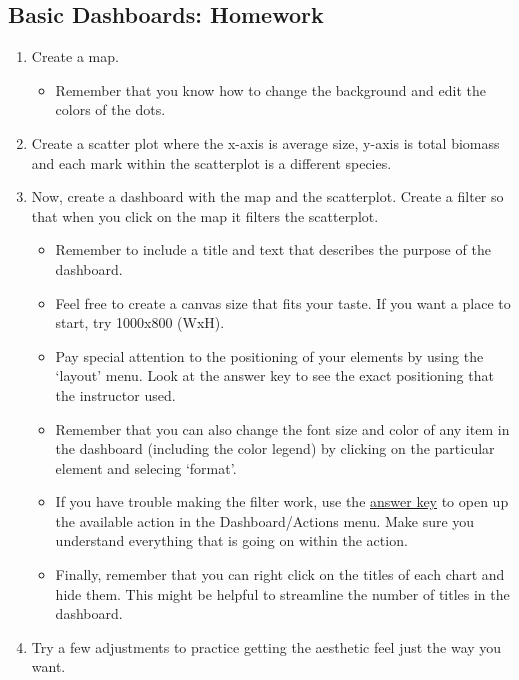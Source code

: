 \documentclass[
]{book}
\providecommand{\tightlist}{%
  \setlength{\itemsep}{0pt}\setlength{\parskip}{0pt}}
\begin{document}
\hypertarget{basic-dashboards-homework}{%
\subsection{Basic Dashboards: Homework}\label{basic-dashboards-homework}}

\begin{enumerate}
\def\labelenumi{\arabic{enumi}.}
\tightlist
\item
  Create a map.

  \begin{itemize}
  \tightlist
  \item
    Remember that you know how to change the background and edit the colors of the dots.
  \end{itemize}
\item
  Create a scatter plot where the x-axis is average size, y-axis is total biomass and each mark within the scatterplot is a different species.
\item
  Now, create a dashboard with the map and the scatterplot. Create a filter so that when you click on the map it filters the scatterplot.

  \begin{itemize}
  \tightlist
  \item
    Remember to include a title and text that describes the purpose of the dashboard.
  \item
    Feel free to create a canvas size that fits your taste. If you want a place to start, try 1000x800 (WxH).
  \item
    Pay special attention to the positioning of your elements by using the `layout' menu. Look at the answer key to see the exact positioning that the instructor used.
  \item
    Remember that you can also change the font size and color of any item in the dashboard (including the color legend) by clicking on the particular element and selecing `format'.
  \item
    If you have trouble making the filter work, use the \href{files/M3S5_exercise_key.twbx}{answer key} to open up the available action in the Dashboard/Actions menu. Make sure you understand everything that is going on within the action.
  \item
    Finally, remember that you can right click on the titles of each chart and hide them. This might be helpful to streamline the number of titles in the dashboard.
  \end{itemize}
\item
  Try a few adjustments to practice getting the aesthetic feel just the way you want.
\end{enumerate}
\end{document}
